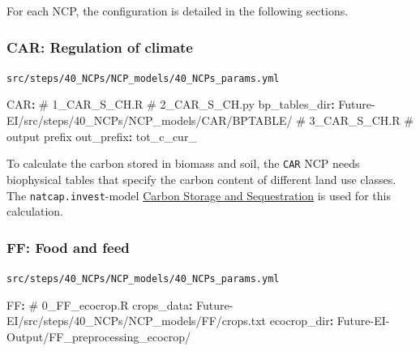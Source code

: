 \documentclass[
  letterpaper,
  DIV=11,
  numbers=noendperiod]{scrreprt}
\newenvironment{Shaded}{\begin{snugshade}}{\end{snugshade}}
\newcommand{\AttributeTok}[1]{\textcolor[rgb]{0.40,0.45,0.13}{#1}}
\newcommand{\CommentTok}[1]{\textcolor[rgb]{0.37,0.37,0.37}{#1}}
\newcommand{\FunctionTok}[1]{\textcolor[rgb]{0.28,0.35,0.67}{#1}}
\newcommand{\KeywordTok}[1]{\textcolor[rgb]{0.00,0.23,0.31}{\textbf{#1}}}
\begin{document}
For each NCP, the configuration is detailed in the following sections.

\subsubsection{CAR: Regulation of climate}\label{CAR}

\begin{codelisting}

\caption{\texttt{src/steps/40\_NCPs/NCP\_models/40\_NCPs\_params.yml}}

\begin{Shaded}
\begin{Highlighting}[]
\FunctionTok{CAR}\KeywordTok{:}
\CommentTok{  \# 1\_CAR\_S\_CH.R}
\CommentTok{  \# 2\_CAR\_S\_CH.py}
\AttributeTok{  }\FunctionTok{bp\_tables\_dir}\KeywordTok{:}
\AttributeTok{    Future{-}EI/src/steps/40\_NCPs/NCP\_models/CAR/BPTABLE/}
\CommentTok{  \# 3\_CAR\_S\_CH.R}
\CommentTok{  \# output prefix}
\AttributeTok{  }\FunctionTok{out\_prefix}\KeywordTok{:}\AttributeTok{ tot\_c\_cur\_}
\end{Highlighting}
\end{Shaded}

\end{codelisting}

To calculate the carbon stored in biomass and soil, the \texttt{CAR} NCP
needs biophysical tables that specify the carbon content of different
land use classes. The \texttt{natcap.invest}-model
\href{https://invest.readthedocs.io/en/latest/models.html\#carbon-storage-and-sequestration}{Carbon
Storage and Sequestration} is used for this calculation.

\subsubsection{FF: Food and feed}\label{FF}

\begin{codelisting}

\caption{\texttt{src/steps/40\_NCPs/NCP\_models/40\_NCPs\_params.yml}}

\begin{Shaded}
\begin{Highlighting}[]
\FunctionTok{FF}\KeywordTok{:}
\CommentTok{  \# 0\_FF\_ecocrop.R}
\AttributeTok{  }\FunctionTok{crops\_data}\KeywordTok{:}
\AttributeTok{    Future{-}EI/src/steps/40\_NCPs/NCP\_models/FF/crops.txt}
\AttributeTok{  }\FunctionTok{ecocrop\_dir}\KeywordTok{:}\AttributeTok{ Future{-}EI{-}Output/FF\_preprocessing\_ecocrop/}
\end{Highlighting}
\end{Shaded}

\end{codelisting}
\end{document}
